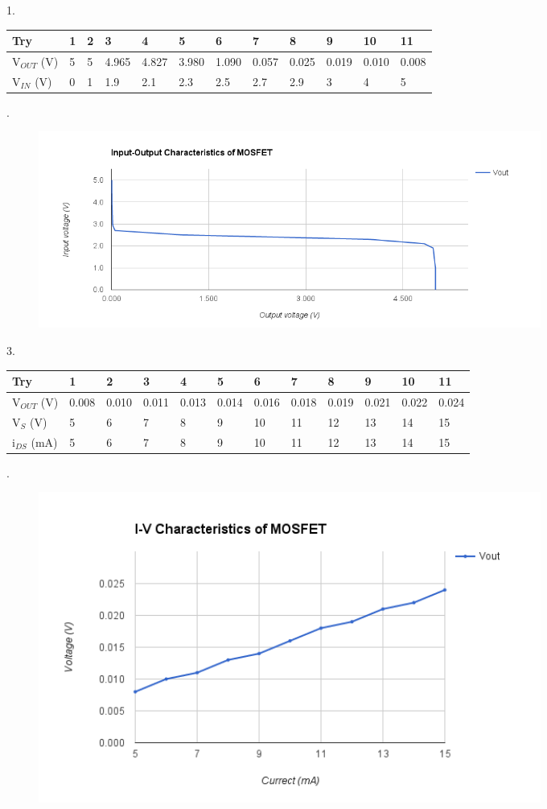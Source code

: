 {	\begin{solution}
		1. 		
		\begin{table}[h]
			\begin{tabular}{| l | l | l | l | l | l | l | l | l | l | l | l |}
				\hline
				Try & 1 & 2 & 3 & 4 & 5 & 6 & 7 & 8 & 9 & 10 & 11 \\ \hline
				V$_{OUT}$ (V) & 5 & 5 & 4.965 & 4.827 & 3.980 & 1.090 & 0.057 & 0.025 & 0.019 & 0.010 & 0.008 \\ \hline
				V$_{IN}$ (V) & 0 & 1 & 1.9 & 2.1 & 2.3 & 2.5 & 2.7 & 2.9 & 3 & 4 & 5 \\ \hline
			\end{tabular}
		\end{table}
		.
		\begin{figure}[h!]
			\centering
			\includegraphics[width=0.8\textwidth]{images/plot422.png}
		\end{figure}
		3.
		\begin{table}[h]
			\begin{tabular}{| l | l | l | l | l | l | l | l | l | l | l | l |}
				\hline
				Try & 1 & 2 & 3 & 4 & 5 & 6 & 7 & 8 & 9 & 10 & 11 \\ \hline
				V$_{OUT}$ (V) & 0.008 & 0.010 & 0.011 & 0.013 & 0.014 & 0.016 & 0.018 & 0.019 & 0.021 & 0.022 & 0.024 \\ \hline
				V$_{S}$ (V) & 5 & 6 & 7 & 8 & 9 & 10 & 11 & 12 & 13 & 14 & 15 \\ \hline
				i$_{DS}$ (mA) & 5 & 6 & 7 & 8 & 9 & 10 & 11 & 12 & 13 & 14 & 15 \\ \hline
			\end{tabular}
		\end{table}
		.
		\begin{figure}[h!]
			\centering
			\includegraphics[width=0.8\textwidth]{images/plot424.png}

\end{figure}
\end{solution}}
